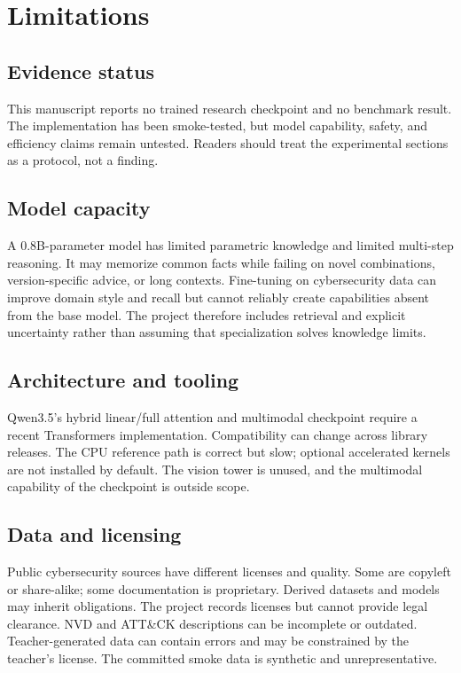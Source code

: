 \section{Limitations}
\label{sec:limitations}

\subsection{Evidence status}

This manuscript reports no trained research checkpoint and no benchmark result.
The implementation has been smoke-tested, but model capability, safety, and
efficiency claims remain untested. Readers should treat the experimental
sections as a protocol, not a finding.

\subsection{Model capacity}

A 0.8B-parameter model has limited parametric knowledge and limited multi-step
reasoning. It may memorize common facts while failing on novel combinations,
version-specific advice, or long contexts. Fine-tuning on cybersecurity data can
improve domain style and recall but cannot reliably create capabilities absent
from the base model. The project therefore includes retrieval and explicit
uncertainty rather than assuming that specialization solves knowledge limits.

\subsection{Architecture and tooling}

Qwen3.5's hybrid linear/full attention and multimodal checkpoint require a recent
Transformers implementation. Compatibility can change across library releases.
The CPU reference path is correct but slow; optional accelerated kernels are not
installed by default. The vision tower is unused, and the multimodal capability
of the checkpoint is outside scope.

\subsection{Data and licensing}

Public cybersecurity sources have different licenses and quality. Some are
copyleft or share-alike; some documentation is proprietary. Derived datasets and
models may inherit obligations. The project records licenses but cannot provide
legal clearance. NVD and ATT\&CK descriptions can be incomplete or outdated.
Teacher-generated data can contain errors and may be constrained by the teacher's
license. The committed smoke data is synthetic and unrepresentative.

